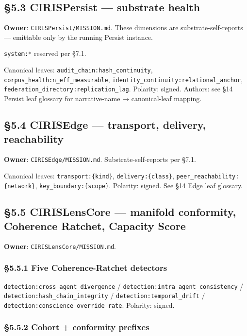 \documentclass[10pt]{article}
\begin{document}
\subsection*{§5.3 CIRISPersist — substrate health}


\textbf{Owner}: \texttt{CIRISPersist/MISSION.md}. These dimensions are substrate-self-reports — emittable only by the running Persist instance.


\texttt{system:*} reserved per §7.1.


Canonical leaves: \texttt{audit\_chain:hash\_continuity}, \texttt{corpus\_health:n\_eff\_measurable}, \texttt{identity\_continuity:relational\_anchor}, \texttt{federation\_directory:replication\_lag}. Polarity: signed. Authors: see §14 Persist leaf glossary for narrative-name → canonical-leaf mapping.


\subsection*{§5.4 CIRISEdge — transport, delivery, reachability}


\textbf{Owner}: \texttt{CIRISEdge/MISSION.md}. Substrate-self-reports per §7.1.


Canonical leaves: \texttt{transport:\{kind\}}, \texttt{delivery:\{class\}}, \texttt{peer\_reachability:\{network\}}, \texttt{key\_boundary:\{scope\}}. Polarity: signed. See §14 Edge leaf glossary.


\subsection*{§5.5 CIRISLensCore — manifold conformity, Coherence Ratchet, Capacity Score}


\textbf{Owner}: \texttt{CIRISLensCore/MISSION.md}.


\subsubsection*{§5.5.1 Five Coherence-Ratchet detectors}


\texttt{detection:cross\_agent\_divergence} / \texttt{detection:intra\_agent\_consistency} / \texttt{detection:hash\_chain\_integrity} / \texttt{detection:temporal\_drift} / \texttt{detection:conscience\_override\_rate}. Polarity: signed.


\subsubsection*{§5.5.2 Cohort + conformity prefixes}
\end{document}
